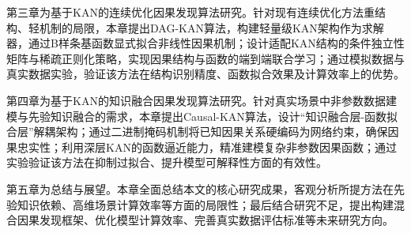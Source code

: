 第三章为基于KAN的连续优化因果发现算法研究。针对现有连续优化方法重结构、轻机制的局限，本章提出DAG-KAN算法，构建轻量级KAN架构作为求解器，通过B样条基函数显式拟合非线性因果机制；设计适配KAN结构的条件独立性矩阵与稀疏正则化策略，实现因果结构与函数的端到端联合学习；通过模拟数据与真实数据实验，验证该方法在结构识别精度、函数拟合效果及计算效率上的优势。

第四章为基于KAN的知识融合因果发现算法研究。针对真实场景中非参数数据建模与先验知识融合的需求，本章提出Causal-KAN算法，设计“知识融合层-函数拟合层”解耦架构；通过二进制掩码机制将已知因果关系硬编码为网络约束，确保因果忠实性；利用深层KAN的函数逼近能力，精准建模复杂非参数因果函数；通过实验验证该方法在抑制过拟合、提升模型可解释性方面的有效性。

第五章为总结与展望。本章全面总结本文的核心研究成果，客观分析所提方法在先验知识依赖、高维场景计算效率等方面的局限性；最后结合研究不足，提出构建混合因果发现框架、优化模型计算效率、完善真实数据评估标准等未来研究方向。
